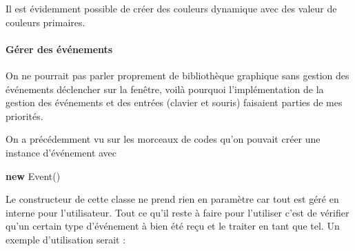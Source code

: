 \documentclass[11pt,a4paper,krantz2,11pt,oneside]{krantz}
\newenvironment{Shaded}{\begin{snugshade}}{\end{snugshade}}
\newcommand{\CommentTok}[1]{\textcolor[rgb]{0.37,0.37,0.37}{\textit{#1}}}
\newcommand{\DecValTok}[1]{\textcolor[rgb]{0.06,0.06,0.06}{#1}}
\newcommand{\FunctionTok}[1]{\textcolor[rgb]{0,0,0}{#1}}
\newcommand{\KeywordTok}[1]{\textcolor[rgb]{0.27,0.27,0.27}{\textbf{#1}}}
\newcommand{\NormalTok}[1]{#1}
\newcommand{\OtherTok}[1]{\textcolor[rgb]{0.37,0.37,0.37}{#1}}
\let\oldparagraph\paragraph
\renewcommand{\paragraph}[1]{\oldparagraph{#1}\mbox{}}
\begin{document}
Il est évidemment possible de créer des couleurs dynamique avec des valeur de couleurs primaires.

\begin{Shaded}
\end{Shaded}

\hypertarget{guxe9rer-des-uxe9vuxe9nements}{%
\paragraph{Gérer des événements}\label{guxe9rer-des-uxe9vuxe9nements}}

On ne pourrait pas parler proprement de bibliothèque graphique sans gestion des événements déclencher sur la fenêtre, voilà pourquoi l'implémentation de la gestion des événements et des entrées (clavier et souris) faisaient parties de mes priorités.

On a précédemment vu sur les morceaux de codes qu'on pouvait créer une instance d'événement avec

\begin{Shaded}
\begin{Highlighting}[]
\KeywordTok{new}\NormalTok{ Event}\OtherTok{()}
\end{Highlighting}
\end{Shaded}

Le constructeur de cette classe ne prend rien en paramètre car tout est géré en interne pour l'utilisateur. Tout ce qu'il reste à faire pour l'utiliser c'est de vérifier qu'un certain type d'événement à bien été reçu et le traiter en tant que tel. Un exemple d'utilisation serait :

\begin{Shaded}
\end{Shaded}
\end{document}
